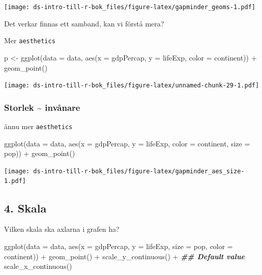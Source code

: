 \documentclass[
]{book}
\newenvironment{Shaded}{\begin{snugshade}}{\end{snugshade}}
\newcommand{\AttributeTok}[1]{\textcolor[rgb]{0.77,0.63,0.00}{#1}}
\newcommand{\DocumentationTok}[1]{\textcolor[rgb]{0.56,0.35,0.01}{\textbf{\textit{#1}}}}
\newcommand{\FunctionTok}[1]{\textcolor[rgb]{0.00,0.00,0.00}{#1}}
\newcommand{\NormalTok}[1]{#1}
\newcommand{\OtherTok}[1]{\textcolor[rgb]{0.56,0.35,0.01}{#1}}
\newcommand{\SpecialCharTok}[1]{\textcolor[rgb]{0.00,0.00,0.00}{#1}}
\begin{document}
\texttt{[image: ds-intro-till-r-bok\_files/figure-latex/gapminder\_geoms-1.pdf]}

Det verkar finnas ett samband, kan vi förstå mera?

Mer \texttt{aesthetics}

\begin{Shaded}
\begin{Highlighting}[]
\NormalTok{p }\OtherTok{\textless{}{-}} \FunctionTok{ggplot}\NormalTok{(}\AttributeTok{data =}\NormalTok{ data,}
            \FunctionTok{aes}\NormalTok{(}\AttributeTok{x =}\NormalTok{ gdpPercap,}
                \AttributeTok{y =}\NormalTok{ lifeExp,}
                \AttributeTok{color =}\NormalTok{ continent)) }\SpecialCharTok{+}
  \FunctionTok{geom\_point}\NormalTok{()}
\end{Highlighting}
\end{Shaded}

\texttt{[image: ds-intro-till-r-bok\_files/figure-latex/unnamed-chunk-29-1.pdf]}

\hypertarget{storlek-invuxe5nare}{%
\subsubsection{Storlek \textasciitilde{} invånare}\label{storlek-invuxe5nare}}

ännu mer \texttt{aesthetics}

\begin{Shaded}
\begin{Highlighting}[]
\FunctionTok{ggplot}\NormalTok{(}\AttributeTok{data =}\NormalTok{ data,}
       \FunctionTok{aes}\NormalTok{(}\AttributeTok{x =}\NormalTok{ gdpPercap,}
                     \AttributeTok{y =}\NormalTok{ lifeExp,}
                     \AttributeTok{color =}\NormalTok{ continent,}
                     \AttributeTok{size =}\NormalTok{ pop)) }\SpecialCharTok{+} 
  \FunctionTok{geom\_point}\NormalTok{()}
\end{Highlighting}
\end{Shaded}

\texttt{[image: ds-intro-till-r-bok\_files/figure-latex/gapminder\_aes\_size-1.pdf]}

\hypertarget{skala}{%
\subsection{4. Skala}\label{skala}}

Vilken skala ska axlarna i grafen ha?

\begin{Shaded}
\begin{Highlighting}[]
\FunctionTok{ggplot}\NormalTok{(}\AttributeTok{data =}\NormalTok{ data, }\FunctionTok{aes}\NormalTok{(}\AttributeTok{x =}\NormalTok{ gdpPercap, }\AttributeTok{y =}\NormalTok{ lifeExp,}
                                  \AttributeTok{size =}\NormalTok{ pop, }\AttributeTok{color =}\NormalTok{ continent)) }\SpecialCharTok{+}
  \FunctionTok{geom\_point}\NormalTok{() }\SpecialCharTok{+}
  \FunctionTok{scale\_y\_continuous}\NormalTok{() }\SpecialCharTok{+} \DocumentationTok{\#\# Default value}
  \FunctionTok{scale\_x\_continuous}\NormalTok{() }
\end{Highlighting}
\end{Shaded}
\end{document}
